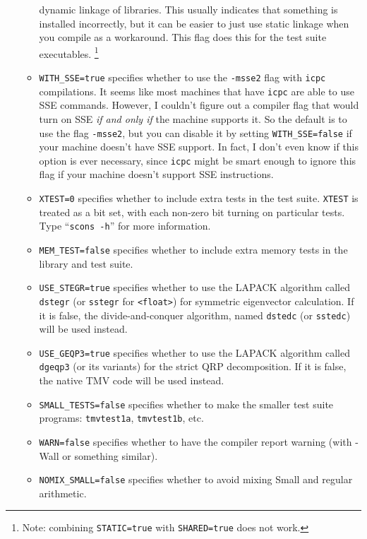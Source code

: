 \documentclass[twoside,letterpaper,11pt]{article}
\renewcommand{\tt}[1]{{\lstinline {#1}}}
\begin{document}
\begin{enumerate}
\begin{itemize}
dynamic linkage of libraries.  This usually indicates that something is installed incorrectly, but
it can be easier to just use static linkage when you compile as a workaround.  This flag does this
for the test suite executables.  \footnote{Note: combining \texttt{STATIC=true} with \texttt{SHARED=true} does not work.}
\item \texttt{WITH\_SSE=true} specifies whether to use the \texttt{-msse2} flag with \texttt{icpc} compilations. 
It seems like most machines that have \texttt{icpc} are able to use SSE commands.  However, 
I couldn't figure out a compiler flag that would turn on SSE {\em if and only if} the machine
supports it.  So the default is to use the flag \texttt{-msse2}, but you can disable it by setting 
\texttt{WITH\_SSE=false} if your machine doesn't have SSE support.  In fact, I don't even know if this option is ever necessary, since \texttt{icpc} might be smart enough to ignore this flag if your machine doesn't support SSE instructions.
\item \texttt{XTEST=0} specifies whether to include extra tests in the test suite.  \texttt{XTEST}
is treated as a bit set, with each non-zero bit turning on particular tests.  Type ``\tt{scons -h}'' for 
more information.
\item \texttt{MEM\_TEST=false} specifies whether to include extra memory tests in the library and test suite.
\item \texttt{USE\_STEGR=true} specifies whether to use the LAPACK algorithm called
\tt{dstegr} (or \tt{sstegr} for \tt{<float>}) for symmetric
eigenvector calculation.  If it is false, the divide-and-conquer algorithm,
named \tt{dstedc} (or \tt{sstedc}) will be used instead.
\item
\texttt{USE\_GEQP3=true} specifies whether to use the LAPACK algorithm called
\tt{dgeqp3} (or its variants) for the strict QRP decomposition.  If it is false,
the native TMV code will be used instead.
\item \texttt{SMALL\_TESTS=false} specifies whether to make the smaller test suite programs: \texttt{tmvtest1a}, \texttt{tmvtest1b}, etc. 
\item \texttt{WARN=false} specifies whether to have the compiler report warning (with -Wall or
something similar).
\item \texttt{NOMIX\_SMALL=false} specifies whether to avoid mixing Small and regular arithmetic.  

\end{itemize}
\end{enumerate}
\end{document}
